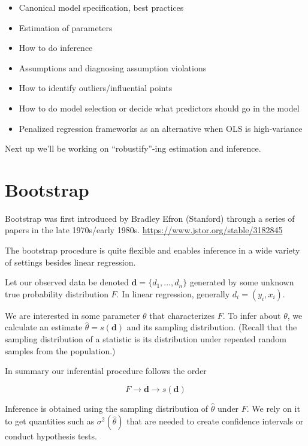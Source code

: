 \documentclass[
  letterpaper,
  DIV=11,
  numbers=noendperiod]{scrreport}
\begin{document}
\begin{itemize}
\item
  Canonical model specification, best practices
\item
  Estimation of parameters
\item
  How to do inference
\item
  Assumptions and diagnosing assumption violations
\item
  How to identify outliers/influential points
\item
  How to do model selection or decide what predictors should go in the
  model
\item
  Penalized regression frameworks as an alternative when OLS is
  high-variance
\end{itemize}

Next up we'll be working on ``robustify''-ing estimation and inference.


\hypertarget{bootstrap}{%
\chapter{Bootstrap}\label{bootstrap}}

Bootstrap was first introduced by Bradley Efron (Stanford) through a
series of papers in the late 1970s/early 1980s.
\url{https://www.jstor.org/stable/3182845}

The bootstrap procedure is quite flexible and enables inference in a
wide variety of settings besides linear regression.

Let our observed data be denoted \(\pmb d = \{ d_1, …, d_n \}\)
generated by some unknown true probability distribution \(F\). In linear
regression, generally \(d_i = (y_i, x_i)\).

We are interested in some parameter \(\theta\) that characterizes \(F\).
To infer about \(\theta\), we calculate an estimate
\(\hat \theta = s(\pmb d)\) and its sampling distribution. (Recall that
the sampling distribution of a statistic is its distribution under
repeated random samples from the population.)

In summary our inferential procedure follows the order

\[
F \longrightarrow \pmb d \longrightarrow s(\pmb d)
\]

Inference is obtained using the sampling distribution of \(\hat \theta\)
under \(F\). We rely on it to get quantities such as
\(\sigma^2(\hat \theta)\) that are needed to create confidence intervals
or conduct hypothesis tests.
\end{document}
